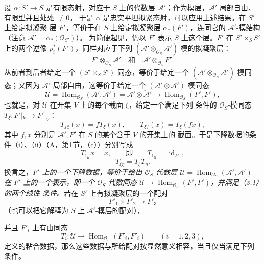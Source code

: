 设 $\alpha:S'\longrightarrow S$ 是有限态射，对应于 $S$ 上的代数层
$\mathcal A'$；作为模层，$\mathcal A'$ 局部自由、有限型并且处处 $\ne0$。
于是 $\alpha$ 是忠实平坦拟紧态射，可以应用上述结果。在 $S'$ 上给定拟凝聚
层 $F'$，等价于在 $S$ 上给定拟凝聚层 $\alpha_*(F')$，连同它的
$\mathcal A'$-模结构（注意 $\mathcal A'=\alpha_*(\mathcal O_{S'})$）。
为简便起见，仍以 $F'$ 表示 $S$ 上这个层。$F'$ 在
$S'\times_SS'$ 上的两个逆像 $p_i^*(F')$，同样对应于下列
$(\mathcal A'\otimes_{\mathcal O_S}\mathcal A')$-模的拟凝聚层：
\[
  F'\otimes_{\mathcal O_S}\mathcal A'
  \quad\text{和}\quad
  \mathcal A'\otimes_{\mathcal O_S}F'.
\]
从前者到后者给定一个 $(S'\times_SS')$-同态，等价于给定一个
$(\mathcal A'\otimes_{\mathcal O_S}\mathcal A')$-模同态；又因为
$\mathcal A'$ 局部自由，这等价于给定一个
$(\mathcal A'\otimes\mathcal A')$-模同态
\[
  \mathcal U=
  \operatorname{Hom}_{\mathcal O_S}(\mathcal A',\mathcal A')
  =\mathcal A'\otimes\check{\mathcal A}'
  \longrightarrow
  \operatorname{Hom}_{\mathcal O_S}(F',F'),
\]
也就是，对 $\mathcal U$ 在开集 $V$ 上的每个截面 $\xi$，给定一个满足下列
条件的 $\mathcal O_S$-模同态
$T_\xi:F'|_V\longrightarrow F'|_V$：
\begin{equation}
  T_{f\xi}(x)=fT_\xi(x),
  \qquad T_{\xi f}(x)=T_\xi(fx),
  \tag{3.1}
\end{equation}
其中 $f,x$ 分别是 $\mathcal A',F'$ 在 $S$ 的某个含于 $V$ 的开集上的
截面。于是下降数据的条件（i）、（ii）（A，第1节，（c））分别写成
\begin{equation}
  T_{1_{\mathcal U}}x=x,
  \qquad\text{即}\qquad
  T_{1_{\mathcal U}}=\operatorname{id}_{F'},
  \tag{3.2}
\end{equation}
\begin{equation}
  T_{\xi\eta}=T_\xi T_\eta.
  \tag{3.3}
\end{equation}
换言之，\emph{$F'$ 上的一个下降数据，等价于给出 $\mathcal O_S$-代数层
$\mathcal U=\operatorname{Hom}_{\mathcal O_S}(\mathcal A',\mathcal A')$
在 $F'$ 上的一个表示，即一个 $\mathcal O_S$-代数同态
$\mathcal U\longrightarrow\operatorname{Hom}_{\mathcal O_S}(F',F')$，并满足（3.1）的两个线性
条件。}若在 $S'$ 上有拟凝聚层的一个配对
\[
  F'_1\times F'_2\longrightarrow F'_3
\]
（也可以把它解释为 $S$ 上 $\mathcal A'$-模层的配对），

并且 $F'_i$ 上有由同态
\[
  T_i:\mathcal U\longrightarrow
  \operatorname{Hom}_{\mathcal O_S}(F'_i,F'_i)
  \qquad (i=1,2,3),
\]
定义的粘合数据，那么这些数据与所给配对按显然意义相容，当且仅当满足下列
条件。

